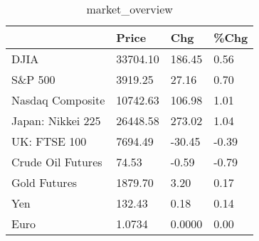 \documentclass{article}%
\begin{document}
%


\begin{table}[htbp]%
\caption{market\_overview}%
\centering%
\begin{adjustbox}{width=1\textwidth}%
\begin{tabular}{llll}
\toprule
                  &    Price &    Chg &  \%Chg \\
\midrule
             DJIA & 33704.10 & 186.45 &  0.56 \\
          S\&P 500 &  3919.25 &  27.16 &  0.70 \\
 Nasdaq Composite & 10742.63 & 106.98 &  1.01 \\
Japan: Nikkei 225 & 26448.58 & 273.02 &  1.04 \\
     UK: FTSE 100 &  7694.49 & -30.45 & -0.39 \\
Crude Oil Futures &    74.53 &  -0.59 & -0.79 \\
     Gold Futures &  1879.70 &   3.20 &  0.17 \\
              Yen &   132.43 &   0.18 &  0.14 \\
             Euro &   1.0734 & 0.0000 &  0.00 \\
\bottomrule
\end{tabular}
%
\end{adjustbox}%
\end{table}

%
\end{document}
